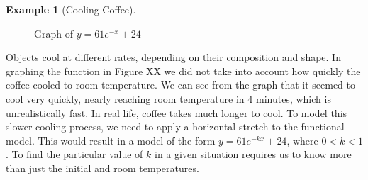 \documentclass[10pt,]{book}
\theoremstyle{plain}
\theoremstyle{definition}
\theoremstyle{definition}
\newtheorem{example}[theorem]{Example}
\theoremstyle{definition}
\numberwithin{equation}{section}
\newcommand{\lt}{<}
\begin{document}
\begin{example}[Cooling Coffee]
\begin{figure}
{
}
\caption{Graph of \(y= 61e^{-x}+24\)\label{figure-cooling-coffee}}
\end{figure}
\hypertarget{p-244}{}%
Objects cool at different rates, depending on their composition and shape. In graphing the function in Figure XX we did not take into account how quickly the coffee cooled to room temperature. We can see from the graph that it seemed to cool very quickly, nearly reaching room temperature in \(4\) minutes, which is unrealistically fast.  In real life, coffee takes much longer to cool.  To model this slower cooling process, we need to apply a horizontal stretch to the functional model.  This would result in a model of the form \(y=61e^{-kx}+24\), where \(0 \lt k \lt 1\).  To find the particular value of \(k\) in a given situation requires us to know more than just the initial and room temperatures.%
\end{example}
\end{document}
